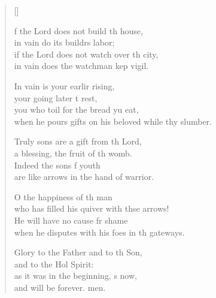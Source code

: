 \settowidth{\versewidth}{when he pours gifts on his beloved while they slumber.}
\begin{verse}[\versewidth]
  \begin{patverse}
f the Lord does not build th house,\Med\\
in vain do its buildrs labor;\\
if the Lord does not watch over th city,\Med\\
in vain does the watchman kep vigil.

In vain is your earlir rising,\Med\\
your going later t rest,\\
you who toil for the bread yu eat,\Med\\
when he pours gifts on his beloved while thy slumber.

Truly sons are a gift from th Lord,\Med\\
a blessing, the fruit of th womb.\\
Indeed the sons f youth\Med\\
are like arrows in the hand of  warrior.

O the happiness of th man\Med\\
who has filled his quiver with thse arrows!\\
He will have no cause fr shame\Med\\
when he disputes with his foes in th gateways.

Glory to the Father and to th Son,\Med\\
and to the Hol Spirit:\\
as it was in the beginning, \pointup{\i}s now,\Med\\
and will be forever. men. 
  \end{patverse}
\end{verse}
